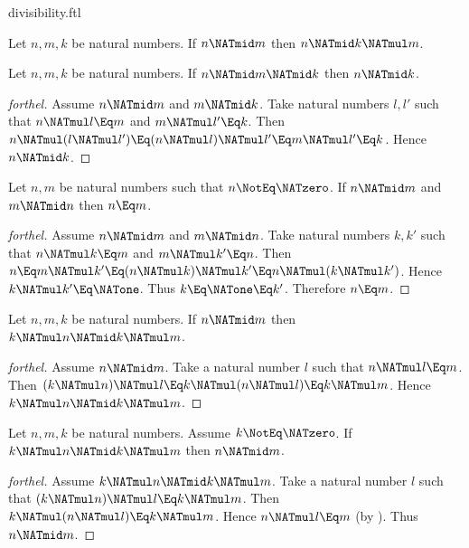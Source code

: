 \documentclass{stex}
\begin{document}
\begin{smodule}{divisibility.ftl}
\begin{corollary}[forthel]
  Let $n, m, k$ be natural numbers.
  If $n \NATmid m$ then $n \NATmid k \NATmul m$.
\end{corollary}

\begin{proposition}[forthel]
  Let $n, m, k$ be natural numbers.
  If $n \NATmid m \NATmid k$ then $n \NATmid k$.
\end{proposition}
\begin{proof}[forthel]
  Assume $n \NATmid m$ and $m \NATmid k$.
  Take natural numbers $l,l'$ such that $n \NATmul l \Eq m$ and $m \NATmul l' \Eq k$.
  Then $n \NATmul (l \NATmul l')
    \Eq (n \NATmul l) \NATmul l'
    \Eq m \NATmul l'
    \Eq k$.
  Hence $n \NATmid k$.
\end{proof}

\begin{proposition}[forthel]
  Let $n, m$ be natural numbers such that $n \NotEq \NATzero$.
  If $n \NATmid m$ and $m \NATmid n$ then $n \Eq m$.
\end{proposition}
\begin{proof}[forthel]
  Assume $n \NATmid m$ and $m \NATmid n$.
  Take natural numbers $k,k'$ such that $n \NATmul k \Eq m$ and $m \NATmul k' \Eq n$.
  Then $n
    \Eq m \NATmul k'
    \Eq (n \NATmul k) \NATmul k'
    \Eq n \NATmul (k \NATmul k')$.
  Hence $k \NATmul k' \Eq \NATone$.
  Thus $k \Eq \NATone \Eq k'$.
  Therefore $n \Eq m$.
\end{proof}

\begin{proposition}[forthel]
  Let $n, m, k$ be natural numbers.
  If $n \NATmid m$ then $k \NATmul n \NATmid k \NATmul m$.
\end{proposition}
\begin{proof}[forthel]
  Assume $n \NATmid m$.
  Take a natural number $l$ such that $n \NATmul l \Eq m$.
  Then $(k \NATmul n) \NATmul l
    \Eq k \NATmul (n \NATmul l)
    \Eq k \NATmul m$.
  Hence $k \NATmul n \NATmid k \NATmul m$.
\end{proof}

\begin{proposition}[forthel]
  Let $n, m, k$ be natural numbers.
  Assume $k \NotEq \NATzero$.
  If $k \NATmul n \NATmid k \NATmul m$ then $n \NATmid m$.
\end{proposition}
\begin{proof}[forthel]
  Assume $k \NATmul n \NATmid k \NATmul m$.
  Take a natural number $l$ such that $(k \NATmul n) \NATmul l \Eq k \NATmul m$.
  Then $k \NATmul (n \NATmul l) \Eq k \NATmul m$.
  Hence $n \NATmul l \Eq m$ (by ).
  Thus $n \NATmid m$.
\end{proof}


\end{smodule}
\end{document}
